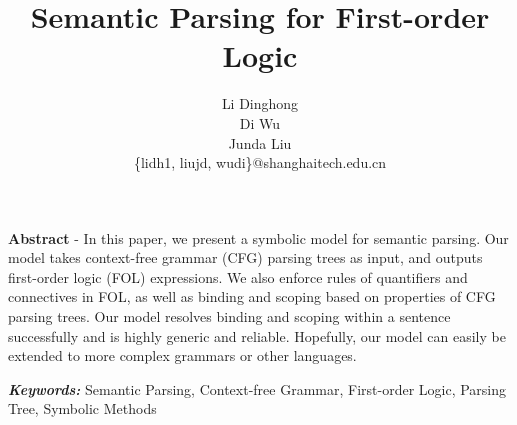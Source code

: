 \documentclass{article}
\title{Semantic Parsing for First-order Logic}
\author{
	Li Dinghong\\
	Di Wu\\
	Junda Liu\\
	\{lidh1, liujd, wudi\}@shanghaitech.edu.cn
}
\begin{document}
{
	\newpage
	\maketitle

	\textbf{Abstract} - {In this paper, we present a symbolic model for semantic parsing. Our model takes context-free grammar (CFG) parsing trees as input, and outputs first-order logic (FOL) expressions. We also enforce rules of quantifiers and connectives in FOL, as well as binding and scoping based on properties of CFG parsing trees. Our model resolves binding and scoping within a sentence successfully and is highly generic and reliable. Hopefully, our model can easily be extended to more complex grammars or other languages. }

	\vspace{5pt}
	\textbf{\emph{Keywords:}} {Semantic Parsing, Context-free Grammar, First-order Logic, Parsing Tree, Symbolic Methods}

	\tableofcontents
}
\end{document}
